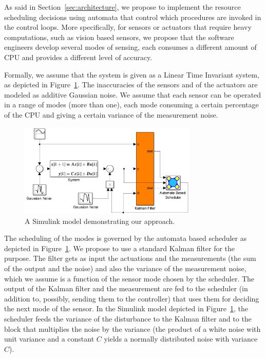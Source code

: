 \documentclass{sig-alternate-ipsn13}
\begin{document}
As said in Section~\ref{sec:architecture}, we propose to implement the resource scheduling decisions using automata that control which procedures are invoked in the control loops. More specifically, for sensors or actuators that require heavy computations, such as vision based sensors, we propose that the software engineers develop several modes of sensing, each consumes a different amount of CPU and provides a different level of accuracy. 

Formally, we assume that the system is given as a Linear Time Invariant system, as depicted in Figure~\ref{fig:simulink}. The inaccuracies of the sensors and of the actuators are modeled as additive Gaussian noise. We assume that each sensor can be operated in a range of modes (more than one), each mode consuming a certain percentage of the CPU and giving a certain variance of the measurement noise.

\begin{figure}%
	\centerline{\includegraphics[width=85mm]{SimulinkModel.jpg}}
	\caption{A Simulink model demonstrating our approach.}
	\label{fig:simulink}
\end{figure}

The scheduling of the modes is governed by the automata based scheduler as depicted in Figure~\ref{fig:simulink}. We propose to use a standard Kalman filter for the purpose. The filter gets as input the actuations and the measurements (the sum of the output and the noise) and also the variance of the measurement noise, which we assume is a function of the sensor mode chosen by the scheduler. The output of the Kalman filter and the measurement are fed to the scheduler (in addition to, possibly, sending them to the controller) that uses them for deciding the next mode of the sensor. In the Simulink model depicted in Figure~\ref{fig:simulink}, the scheduler feeds the variance of the disturbance to the Kalman filter and to the block that multiplies the noise by the variance (the product of a white noise with unit variance and a constant $C$ yields a normally distributed noise with variance $C$).
\end{document}
